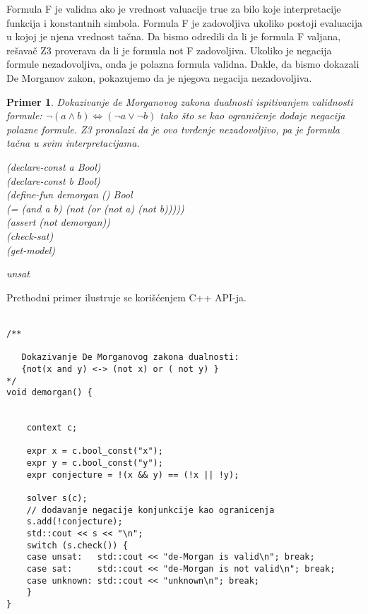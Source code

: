 \documentclass[12pt,oneside]{memoir}
\newtheorem{primer}{Primer}
\begin{document}
Formula F je validna ako je vrednost valuacije true za bilo koje interpretacije funkcija i konstantnih simbola. Formula F je zadovoljiva ukoliko postoji evaluacija u kojoj je njena vrednost tačna. Da bismo odredili da li je formula F valjana, rešavač Z3 proverava da li je formula not F zadovoljiva. Ukoliko je negacija formule nezadovoljiva, onda je polazna formula validna. Dakle, da bismo dokazali De Morganov zakon, pokazujemo da je njegova negacija nezadovoljiva. 
\begin{primer} Dokazivanje de Morganovog zakona dualnosti ispitivanjem validnosti formule: $\neg{(a \land b)} \Leftrightarrow (\neg{a} \lor \neg{b}) $ tako što se kao ograničenje dodaje negacija polazne formule. Z3 pronalazi da je ovo tvrđenje nezadovoljivo, pa je formula tačna u svim interpretacijama. \\

\hspace{-0.7cm}
\begin{minipage}[b]{0.4\textwidth}
(declare-const a Bool)
\\(declare-const b Bool)
\\(define-fun demorgan () Bool
\\    (= (and a b) (not (or (not a) (not b)))))
\\(assert (not demorgan))
\\(check-sat) 
\\(get-model)
\end{minipage}
\hspace{3.5cm}
\begin{minipage}[t]{0.4\textwidth}
\vspace{-5cm}
unsat
\end{minipage}
\end{primer}



Prethodni primer ilustruje se korišćenjem C++ API-ja.
\\ \\
\begin{lstlisting}
/**

   Dokazivanje De Morganovog zakona dualnosti: 
   {not(x and y) <-> (not x) or ( not y) }
*/
void demorgan() {

    
    context c;

    expr x = c.bool_const("x");
    expr y = c.bool_const("y");
    expr conjecture = !(x && y) == (!x || !y);
    
    solver s(c);
    // dodavanje negacije konjunkcije kao ogranicenja
    s.add(!conjecture);
    std::cout << s << "\n";
    switch (s.check()) {
    case unsat:   std::cout << "de-Morgan is valid\n"; break;
    case sat:     std::cout << "de-Morgan is not valid\n"; break;
    case unknown: std::cout << "unknown\n"; break;
    }
}

\end{lstlisting}
\end{document}
